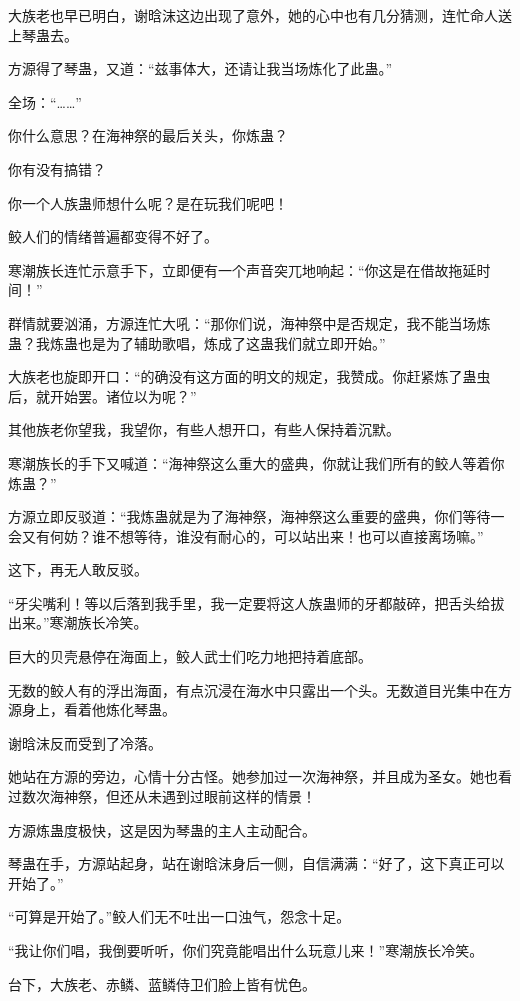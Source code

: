 \begin{this_body}
大族老也早已明白，谢晗沫这边出现了意外，她的心中也有几分猜测，连忙命人送上琴蛊去。

方源得了琴蛊，又道：“兹事体大，还请让我当场炼化了此蛊。”

全场：“……”

你什么意思？在海神祭的最后关头，你炼蛊？

你有没有搞错？

你一个人族蛊师想什么呢？是在玩我们呢吧！

鲛人们的情绪普遍都变得不好了。

寒潮族长连忙示意手下，立即便有一个声音突兀地响起：“你这是在借故拖延时间！”

群情就要汹涌，方源连忙大吼：“那你们说，海神祭中是否规定，我不能当场炼蛊？我炼蛊也是为了辅助歌唱，炼成了这蛊我们就立即开始。”

大族老也旋即开口：“的确没有这方面的明文的规定，我赞成。你赶紧炼了蛊虫后，就开始罢。诸位以为呢？”

其他族老你望我，我望你，有些人想开口，有些人保持着沉默。

寒潮族长的手下又喊道：“海神祭这么重大的盛典，你就让我们所有的鲛人等着你炼蛊？”

方源立即反驳道：“我炼蛊就是为了海神祭，海神祭这么重要的盛典，你们等待一会又有何妨？谁不想等待，谁没有耐心的，可以站出来！也可以直接离场嘛。”

这下，再无人敢反驳。

“牙尖嘴利！等以后落到我手里，我一定要将这人族蛊师的牙都敲碎，把舌头给拔出来。”寒潮族长冷笑。

巨大的贝壳悬停在海面上，鲛人武士们吃力地把持着底部。

无数的鲛人有的浮出海面，有点沉浸在海水中只露出一个头。无数道目光集中在方源身上，看着他炼化琴蛊。

谢晗沫反而受到了冷落。

她站在方源的旁边，心情十分古怪。她参加过一次海神祭，并且成为圣女。她也看过数次海神祭，但还从未遇到过眼前这样的情景！

方源炼蛊度极快，这是因为琴蛊的主人主动配合。

琴蛊在手，方源站起身，站在谢晗沫身后一侧，自信满满：“好了，这下真正可以开始了。”

“可算是开始了。”鲛人们无不吐出一口浊气，怨念十足。

“我让你们唱，我倒要听听，你们究竟能唱出什么玩意儿来！”寒潮族长冷笑。

台下，大族老、赤鳞、蓝鳞侍卫们脸上皆有忧色。


\end{this_body}
